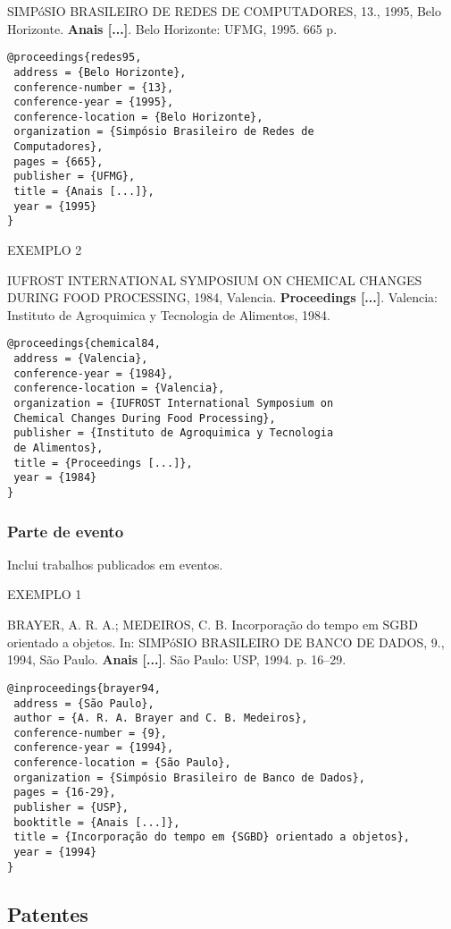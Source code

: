 SIMPóSIO BRASILEIRO DE REDES DE COMPUTADORES, 13., 1995, Belo Horizonte. \textbf{Anais [...]}. Belo Horizonte: UFMG, 1995. 665 p.

\begin{verbatim}
@proceedings{redes95,
 address = {Belo Horizonte},
 conference-number = {13},
 conference-year = {1995},
 conference-location = {Belo Horizonte},
 organization = {Simpósio Brasileiro de Redes de 
 Computadores},
 pages = {665},
 publisher = {UFMG},
 title = {Anais [...]},
 year = {1995}
}
\end{verbatim}

EXEMPLO 2 

IUFROST INTERNATIONAL SYMPOSIUM ON CHEMICAL CHANGES DURING FOOD PROCESSING, 1984, Valencia. \textbf{Proceedings [...]}. Valencia: Instituto de Agroquimica y Tecnologia de Alimentos, 1984.

\begin{verbatim}
@proceedings{chemical84,
 address = {Valencia},
 conference-year = {1984},
 conference-location = {Valencia},
 organization = {IUFROST International Symposium on 
 Chemical Changes During Food Processing},
 publisher = {Instituto de Agroquimica y Tecnologia 
 de Alimentos},
 title = {Proceedings [...]},
 year = {1984}
}
\end{verbatim}

\subsubsection{Parte de evento}

Inclui trabalhos publicados em eventos.

EXEMPLO 1 

BRAYER, A. R. A.; MEDEIROS, C. B. Incorporação do tempo em SGBD orientado a objetos. In: SIMPóSIO BRASILEIRO DE BANCO DE DADOS, 9., 1994, São Paulo. \textbf{Anais [...]}. São Paulo: USP, 1994. p. 16–29. 

\begin{verbatim}
@inproceedings{brayer94,
 address = {São Paulo},
 author = {A. R. A. Brayer and C. B. Medeiros},
 conference-number = {9},
 conference-year = {1994},
 conference-location = {São Paulo},
 organization = {Simpósio Brasileiro de Banco de Dados},
 pages = {16-29},
 publisher = {USP},
 booktitle = {Anais [...]},
 title = {Incorporação do tempo em {SGBD} orientado a objetos},
 year = {1994}
}
\end{verbatim}

\subsection{Patentes}

